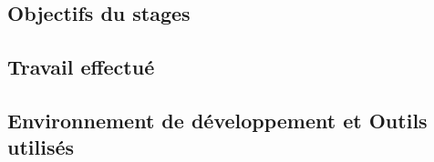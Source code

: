\subsection{Objectifs du stages}


\subsection{Travail effectué}


\subsection{Environnement de développement et Outils utilisés}

